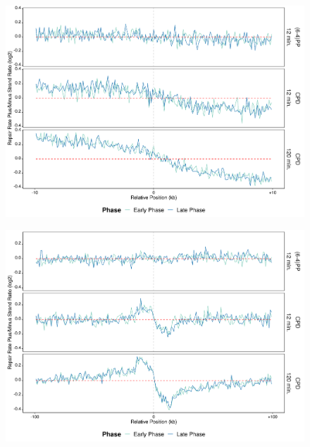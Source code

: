 \begin{figure}[H]
\begin{center}
\includegraphics[width=\textwidth]{Chapters/7_appendix/figures/supfig43}
\caption[]{}
\label{supfig:}
\end{center}
\end{figure}

\begin{figure}[H]
\begin{center}
\includegraphics[width=\textwidth]{Chapters/7_appendix/figures/supfig44}
\caption[]{}
\label{supfig:}
\end{center}
\end{figure}


